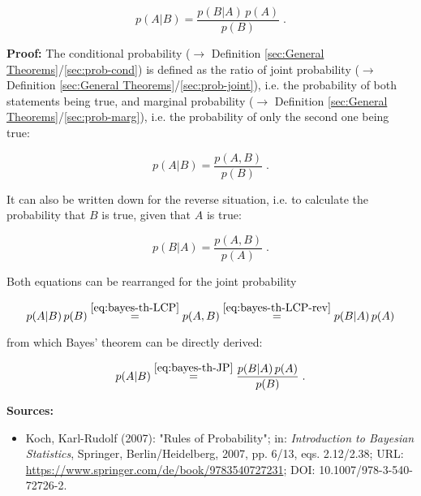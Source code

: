 \documentclass[a4paper,12pt,twoside]{book}
\begin{document}
\begin{equation} \label{eq:bayes-th-BT}
p(A|B) = \frac{p(B|A) \, p(A)}{p(B)} \; .
\end{equation}


\vspace{1em}
\textbf{Proof:} The conditional probability ($\rightarrow$ Definition \ref{sec:General Theorems}/\ref{sec:prob-cond}) is defined as the ratio of joint probability ($\rightarrow$ Definition \ref{sec:General Theorems}/\ref{sec:prob-joint}), i.e. the probability of both statements being true, and marginal probability ($\rightarrow$ Definition \ref{sec:General Theorems}/\ref{sec:prob-marg}), i.e. the probability of only the second one being true:

\begin{equation} \label{eq:bayes-th-LCP}
p(A|B) = \frac{p(A,B)}{p(B)} \; .
\end{equation}

It can also be written down for the reverse situation, i.e. to calculate the probability that $B$ is true, given that $A$ is true:

\begin{equation} \label{eq:bayes-th-LCP-rev}
p(B|A) = \frac{p(A,B)}{p(A)} \; .
\end{equation}

Both equations can be rearranged for the joint probability

\begin{equation} \label{eq:bayes-th-JP}
p(A|B) \, p(B) \overset{\eqref{eq:bayes-th-LCP}}{=} p(A,B) \overset{\eqref{eq:bayes-th-LCP-rev}}{=} p(B|A) \, p(A)
\end{equation}

from which Bayes' theorem can be directly derived:

\begin{equation} \label{eq:bayes-th-BT-proof}
p(A|B) \overset{\eqref{eq:bayes-th-JP}}{=} \frac{p(B|A) \, p(A)}{p(B)} \; .
\end{equation}


\vspace{1em}
\textbf{Sources:}
\begin{itemize}
\item Koch, Karl-Rudolf (2007): "Rules of Probability"; in: \textit{Introduction to Bayesian Statistics}, Springer, Berlin/Heidelberg, 2007, pp. 6/13, eqs. 2.12/2.38; URL: \url{https://www.springer.com/de/book/9783540727231}; DOI: 10.1007/978-3-540-72726-2.
\end{itemize}
\end{document}
